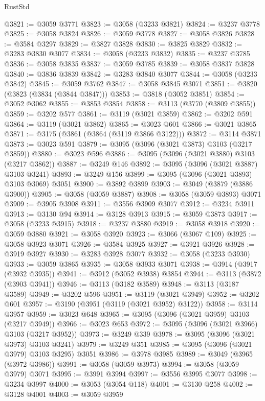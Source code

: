 \begin{lexlean}{RustStd}
\begin{coremodule}
@3821 := @3059 @3771
@3823 := @3058 (@3233 @3821)
@3824 := @3237 @3778
@3825 := @3058 @3824
@3826 := @3059 @3778
@3827 := @3058 @3826
@3828 := @3584 @3297
@3829 := @3827 @3828
@3830 := @3825 @3829
@3832 := @3283 @3830 @3077
@3834 := @3058 (@3233 @3832)
@3835 := @3237 @3785
@3836 := @3058 @3835
@3837 := @3059 @3785
@3839 := @3058 @3837 @3828
@3840 := @3836 @3839
@3842 := @3283 @3840 @3077
@3844 := @3058 (@3233 @3842)
@3845 := @3059 @3762
@3847 := @3058 @3845 @3071
@3851 := @3820 (@3823 (@3834 (@3844 @3847)))
@3853 := @3818 (@3052 @3851)
@3854 := @3052 @3062
@3855 := @3853 @3854
@3858 := @3113 (@3770 (@3809 @3855))
@3859 := @3202 @577
@3861 := @3119 (@3021 @3859)
@3862 := @3202 @591
@3864 := @3119 (@3021 @3862)
@3865 := @3023 @601
@3866 := @3021 @3865
@3871 := @3175 (@3861 (@3864 (@3119 @3866 @3122)))
@3872 := @3114 @3871
@3873 := @3023 @591
@3879 := @3095 (@3096 (@3021 @3873) @3103 (@3217 @3859))
@3880 := @3023 @596
@3886 := @3095 (@3096 (@3021 @3880) @3103 (@3217 @3862))
@3887 := @3249 @146
@3892 := @3095 (@3096 (@3021 @3887) @3103 @3241)
@3893 := @3249 @156
@3899 := @3095 (@3096 (@3021 @3893) @3103 @3069) @3051
@3900 := @3892 @3899
@3903 := @3049 (@3879 (@3886 @3900))
@3905 := @3058 (@3059 @3887)
@3908 := @3058 (@3059 @3893) @3071
@3909 := @3905 @3908
@3911 := @3556 @3909 @3077
@3912 := @3234 @3911
@3913 := @3130 @94
@3914 := @3128 @3913
@3915 := @3059 @3873
@3917 := @3058 (@3233 @3915)
@3918 := @3237 @3880
@3919 := @3058 @3918
@3920 := @3059 @3880
@3921 := @3058 @3920
@3923 := @3066 (@3067 @109)
@3925 := @3058 @3923 @3071
@3926 := @3584 @3925
@3927 := @3921 @3926
@3928 := @3919 @3927
@3930 := @3283 @3928 @3077
@3932 := @3058 (@3233 @3930)
@3933 := @3059 @3865
@3935 := @3058 @3933 @3071
@3938 := @3914 (@3917 (@3932 @3935))
@3941 := @3912 (@3052 @3938) @3854
@3944 := @3113 (@3872 (@3903 @3941))
@3946 := @3113 (@3182 @3589)
@3948 := @3113 (@3187 @3589)
@3949 := @3202 @596
@3951 := @3119 (@3021 @3949)
@3952 := @3202 @601
@3957 := @3190 (@3951 (@3119 (@3021 @3952) @3122))
@3958 := @3114 @3957
@3959 := @3023 @648
@3965 := @3095 (@3096 (@3021 @3959) @3103 (@3217 @3949))
@3966 := @3023 @653
@3972 := @3095 (@3096 (@3021 @3966) @3103 (@3217 @3952))
@3973 := @3249 @339
@3978 := @3095 (@3096 (@3021 @3973) @3103 @3241)
@3979 := @3249 @351
@3985 := @3095 (@3096 (@3021 @3979) @3103 @3295) @3051
@3986 := @3978 @3985
@3989 := @3049 (@3965 (@3972 @3986))
@3991 := @3058 (@3059 @3973)
@3994 := @3058 (@3059 @3979) @3071
@3995 := @3991 @3994
@3997 := @3556 @3995 @3077
@3998 := @3234 @3997
@4000 := @3053 (@3054 @118)
@4001 := @3130 @258
@4002 := @3128 @4001
@4003 := @3059 @3959

\end{coremodule}
\end{lexlean}
